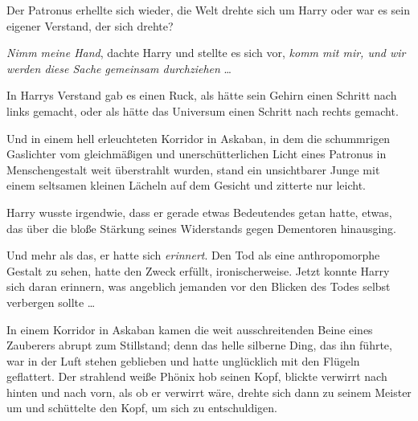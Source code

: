 Der Patronus erhellte sich wieder, die Welt drehte sich um Harry oder war es sein eigener Verstand, der sich drehte?

\emph{Nimm meine Hand}, dachte Harry und stellte es sich vor, \emph{komm mit mir, und wir werden diese Sache} \emph{gemeinsam durchziehen} …

In Harrys Verstand gab es einen Ruck, als hätte sein Gehirn einen Schritt nach links gemacht, oder als hätte das Universum einen Schritt nach rechts gemacht.

Und in einem hell erleuchteten Korridor in Askaban, in dem die schummrigen Gaslichter vom gleichmäßigen und unerschütterlichen Licht eines Patronus in Menschengestalt weit überstrahlt wurden, stand ein unsichtbarer Junge mit einem seltsamen kleinen Lächeln auf dem Gesicht und zitterte nur leicht.

Harry wusste irgendwie, dass er gerade etwas Bedeutendes getan hatte, etwas, das über die bloße Stärkung seines Widerstands gegen Dementoren hinausging.

Und mehr als das, er hatte sich \emph{erinnert}. Den Tod als eine anthropomorphe Gestalt zu sehen, hatte den Zweck erfüllt, ironischerweise. Jetzt konnte Harry sich daran erinnern, was angeblich jemanden vor den Blicken des Todes selbst verbergen sollte …

\later

In einem Korridor in Askaban kamen die weit ausschreitenden Beine eines Zauberers abrupt zum Stillstand; denn das helle silberne Ding, das ihn führte, war in der Luft stehen geblieben und hatte unglücklich mit den Flügeln geflattert. Der strahlend weiße Phönix hob seinen Kopf, blickte verwirrt nach hinten und nach vorn, als ob er verwirrt wäre, drehte sich dann zu seinem Meister um und schüttelte den Kopf, um sich zu entschuldigen.

